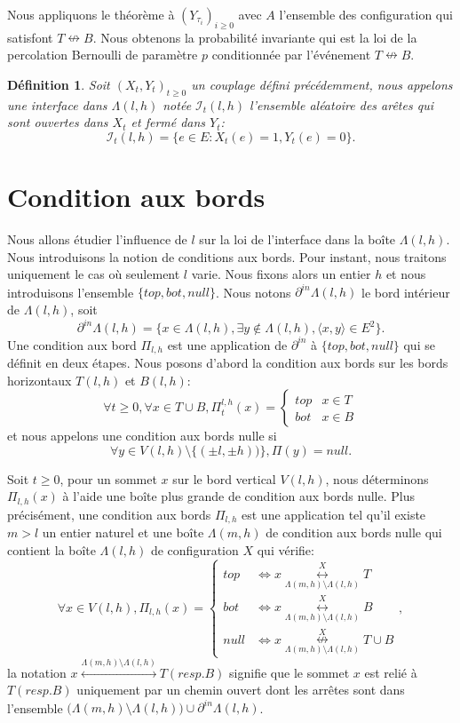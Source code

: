 \documentclass[titlepage,a4paper,12pt]{article}
\newcounter{def}
\newtheorem{interface}[def]{Définition}
\begin{document}
Nous appliquons le théorème à $(Y_{\tau_i})_{i\geqslant 0}$ avec $A$ l'ensemble des configuration qui satisfont $T\nleftrightarrow B$. Nous obtenons la probabilité invariante qui est la loi de la percolation Bernoulli de paramètre $p$ conditionnée par l'événement $T\nleftrightarrow B$.

\begin{interface}
Soit $(X_t,Y_t)_{t\geqslant 0}$ un couplage défini précédemment, nous appelons une interface dans $\Lambda({l,h})$ notée $\mathcal{I}_t({l,h})$ l'ensemble aléatoire des arêtes qui sont ouvertes dans $X_t$ et fermé dans $Y_t$: $$ \mathcal{I}_t({l,h}) = \big\{ e\in E: X_t(e) = 1, Y_t(e) = 0 \big\}.
$$
\end{interface}
\section{Condition aux bords}
Nous allons étudier l'influence de $l$ sur la loi de l'interface dans la boîte $\Lambda(l,h)$. Nous introduisons la notion de conditions aux bords. Pour instant, nous traitons uniquement le cas où seulement $l$ varie. Nous fixons alors un entier $h$ et nous introduisons l'ensemble $\{top,bot,null\}$. Nous notons $\partial^{in}\Lambda(l,h)$ le bord intérieur de $\Lambda(l,h)$, soit
$$ \partial^{in}\Lambda(l,h) = \{x\in \Lambda(l,h), \exists y \notin \Lambda(l,h), \langle x,y\rangle\in E^2\}.
$$
Une condition aux bord $\Pi_{l,h}$ est une application de $\partial^{in}$ à $\{top,bot,null\}$ qui se définit en deux étapes.
Nous posons d'abord la condition aux bords sur les bords horizontaux $T(l,h)$ et $B(l,h)$:
$$ \forall t\geqslant 0, \forall x\in T\cup B, \Pi_t^{l,h}(x) = \left\lbrace \begin{array}{ll}
top & x\in T\\
bot & x\in B
\end{array}
\right.
$$ et nous appelons une condition aux bords nulle si
$$\forall y\in V(l,h)\setminus \{(\pm l,\pm h))\}, \Pi(y) = null.
$$

Soit $t\geqslant 0$, pour un sommet $x$ sur le bord vertical $V(l,h)$, nous déterminons $\Pi_{l,h}(x)$ à l'aide une boîte plus grande de condition aux bords nulle. Plus précisément, une condition aux bords $\Pi_{l,h}$ est une application tel qu'il existe $m>l$ un entier naturel et une boîte $\Lambda(m,h)$ de condition aux bords nulle qui contient la boîte $\Lambda(l,h)$ de configuration $X$ qui vérifie:
$$\forall x \in V(l,h),\Pi_{l,h}(x)=\left\lbrace \begin{array}{cl}
top & \Leftrightarrow x\overset{X}{\underset{\Lambda(m,h) \setminus \Lambda(l,h)}{\longleftrightarrow}} T\\
bot & \Leftrightarrow x\overset{X}{\underset{\Lambda(m,h) \setminus \Lambda(l,h)}{\longleftrightarrow}} B\\
null & \Leftrightarrow x\overset{X}{\underset{\Lambda(m,h) \setminus \Lambda(l,h)}{\nleftrightarrow}} T\cup B 
\end{array} \right.,
$$
la notation $x\overset{\Lambda(m,h) \setminus \Lambda(l,h)}{\longleftrightarrow} T(resp. B)$ signifie que le sommet $x$ est relié à $T(resp. B)$ uniquement par un chemin ouvert dont les arrêtes sont dans l'ensemble $\big(\Lambda(m,h) \setminus \Lambda(l,h)\big) \cup \partial^{in} \Lambda(l,h)$. 
\end{document}
